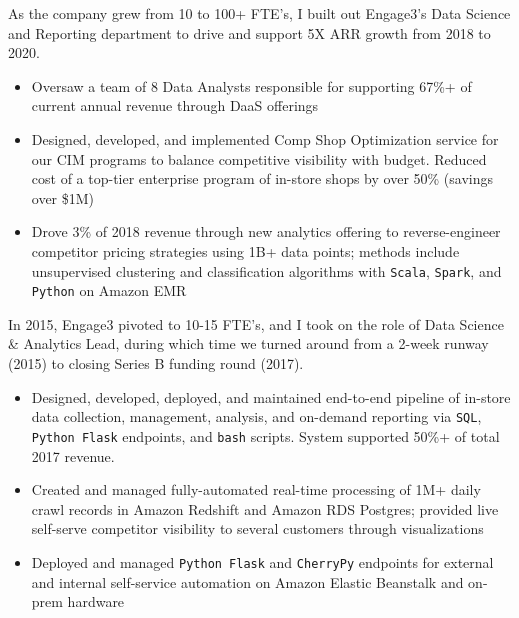 \documentclass[]{deedy-resume-openfont}
\begin{document}
\sectionsep

As the company grew from 10 to 100+ FTE's, I built out Engage3's Data Science and Reporting department to drive and support 5X ARR growth from 2018 to 2020. %
\begin{itemize} %
\item Oversaw a team of 8 Data Analysts responsible for supporting 67\%+ of current annual revenue through DaaS offerings
\item Designed, developed, and implemented Comp Shop Optimization service for our CIM programs to balance competitive visibility with budget.  Reduced cost of a top-tier enterprise program of in-store shops by over 50\% (savings over \$1M)
\item Drove 3\% of 2018 revenue through new analytics offering to reverse-engineer competitor pricing strategies using 1B+ data points; methods include unsupervised clustering and classification algorithms with \verb|Scala|, \verb|Spark|, and \verb|Python| on Amazon EMR
\end{itemize} %

\sectionsep


\newpage
{}
In 2015, Engage3 pivoted to 10-15 FTE's, and I took on the role of Data Science \& Analytics Lead, during which time we turned around from a 2-week runway (2015) to closing Series B funding round (2017).
\begin{itemize} %
\item Designed, developed, deployed, and maintained end-to-end pipeline of in-store data collection, management, analysis, and on-demand reporting via \verb|SQL|, \verb|Python Flask| endpoints, and \verb|bash| scripts.  System supported 50\%+ of total 2017 revenue.
\item Created and managed fully-automated real-time processing of 1M+ daily crawl records in Amazon Redshift and Amazon RDS Postgres; provided live self-serve competitor visibility to several customers through visualizations
\item Deployed and managed \verb|Python Flask| and \verb|CherryPy| endpoints for external and internal self-service automation on Amazon Elastic Beanstalk and on-prem hardware
\end{itemize} %
\end{document}
